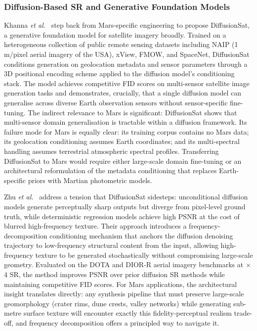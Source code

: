 \documentclass[10pt,journal]{IEEEtran}
\begin{document}
\subsubsection{Diffusion-Based SR and Generative Foundation Models}

Khanna \textit{et al.}~\cite{khanna2024diffusionsat} step back from
Mars-specific engineering to propose DiffusionSat, a generative foundation model
for satellite imagery broadly. Trained on a heterogeneous collection of public
remote sensing datasets including NAIP (1\,m/pixel aerial imagery of the USA),
xView, FMOW, and SpaceNet, DiffusionSat conditions generation on geolocation
metadata and sensor parameters through a 3D positional encoding scheme applied to
the diffusion model's conditioning stack. The model achieves competitive FID scores
on multi-sensor satellite image generation tasks and demonstrates, crucially, that
a single diffusion model can generalise across diverse Earth observation sensors
without sensor-specific fine-tuning. The indirect relevance to Mars is significant:
DiffusionSat shows that multi-sensor domain generalisation is tractable within a
diffusion framework. Its failure mode for Mars is equally clear: its training
corpus contains no Mars data; its geolocation conditioning assumes Earth
coordinates; and its multi-spectral handling assumes terrestrial atmospheric
spectral profiles. Transferring DiffusionSat to Mars would require either
large-scale domain fine-tuning or an architectural reformulation of the metadata
conditioning that replaces Earth-specific priors with Martian photometric models.

Zhu \textit{et al.}~\cite{zhu2025taming} address a tension that DiffusionSat
sidesteps: unconditional diffusion models generate perceptually sharp outputs but
diverge from pixel-level ground truth, while deterministic regression models
achieve high PSNR at the cost of blurred high-frequency texture. Their approach
introduces a frequency-decomposition conditioning mechanism that anchors the
diffusion denoising trajectory to low-frequency structural content from the input,
allowing high-frequency texture to be generated stochastically without
compromising large-scale geometry. Evaluated on the DOTA and DIOR-R aerial
imagery benchmarks at $\times$4 SR, the method improves PSNR over prior
diffusion SR methods while maintaining competitive FID scores. For Mars
applications, the architectural insight translates directly: any synthesis pipeline
that must preserve large-scale geomorphology (crater rims, dune crests, valley
networks) while generating sub-metre surface texture will encounter exactly
this fidelity-perceptual realism trade-off, and frequency decomposition offers
a principled way to navigate it.
\end{document}
